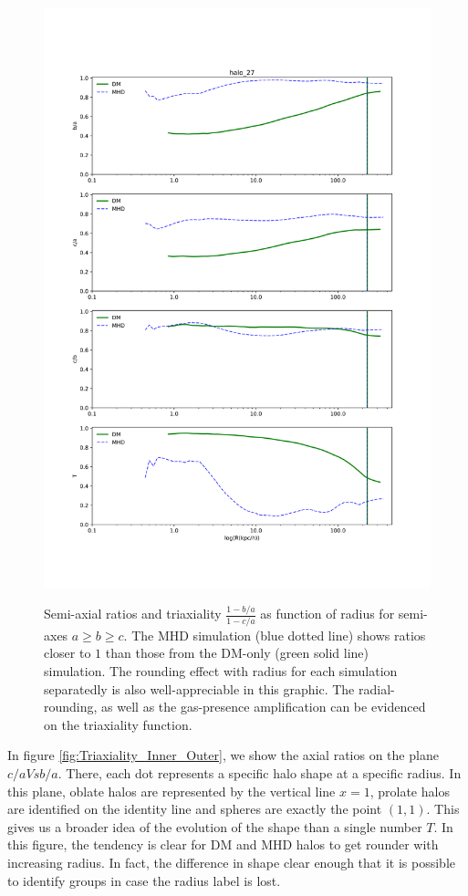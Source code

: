 \begin{figure}
\centering
{\includegraphics[width=1\columnwidth]{./pics/MHD_Vs_DM/level4_halo_27_DM_Vs_MHD.png}}
\caption{Semi-axial ratios and triaxiality $\frac{1-b/a}{1-c/a}$ as function of radius for semi-axes $a\geq b\geq c$. The MHD simulation (blue dotted line) shows ratios closer to $1$ than those from the DM-only (green solid line) simulation. The rounding effect with radius for each simulation separatedly is also well-appreciable in this graphic. The radial-rounding, as well as the gas-presence amplification can be evidenced on the triaxiality function. }
\label{fig:DM_MHD}
\end{figure} 


In figure \ref{fig:Triaxiality_Inner_Outer}, we show the axial ratios on the plane $c/a Vs b/a$. There, each dot represents a specific halo shape at a specific radius. In this plane, oblate halos are represented by the vertical line $x = 1$, prolate halos are identified on the identity line and spheres are exactly the point $(1,1)$. This gives us a broader idea of the evolution of the shape than a single number $T$. In this figure, the tendency is clear for DM and MHD halos to get rounder with increasing radius. In fact, the difference in shape clear enough that it is possible to identify groups in case the radius label is lost.\\


